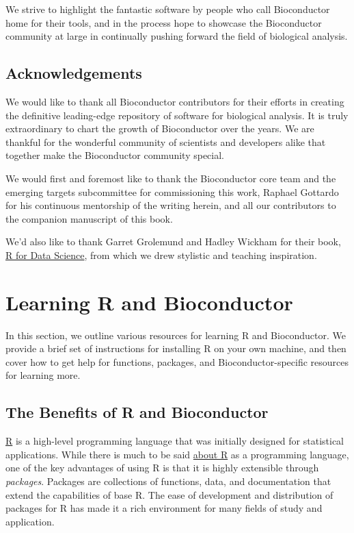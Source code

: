 \documentclass[]{book}
\begin{document}
We strive to highlight the fantastic software by people who call Bioconductor home for their tools, and in the process hope to showcase the Bioconductor community at large in continually pushing forward the field of biological analysis.

\hypertarget{acknowledgements}{%
\section{Acknowledgements}\label{acknowledgements}}

We would like to thank all Bioconductor contributors for their efforts in creating the definitive leading-edge repository of software for biological analysis. It is truly extraordinary to chart the growth of Bioconductor over the years. We are thankful for the wonderful community of scientists and developers alike that together make the Bioconductor community special.

We would first and foremost like to thank the Bioconductor core team and the emerging targets subcommittee for commissioning this work, Raphael Gottardo for his continuous mentorship of the writing herein, and all our contributors to the companion manuscript of this book.

We'd also like to thank Garret Grolemund and Hadley Wickham for their book, \href{https://r4ds.had.co.nz/index.html}{R for Data Science}, from which we drew stylistic and teaching inspiration.

\hypertarget{learning-r-and-more}{%
\chapter{Learning R and Bioconductor}\label{learning-r-and-more}}

In this section, we outline various resources for learning R and Bioconductor. We provide a brief set of instructions for installing R on your own machine, and then cover how to get help for functions, packages, and Bioconductor-specific resources for learning more.

\hypertarget{the-benefits-of-r-and-bioconductor}{%
\section{The Benefits of R and Bioconductor}\label{the-benefits-of-r-and-bioconductor}}

\href{http://www.r-project.org/}{R} is a high-level programming language that was initially designed for statistical applications. While there is much to be said \href{https://www.r-project.org/about.html}{about R} as a programming language, one of the key advantages of using R is that it is highly extensible through \emph{packages}. Packages are collections of functions, data, and documentation that extend the capabilities of base R. The ease of development and distribution of packages for R has made it a rich environment for many fields of study and application.
\end{document}
